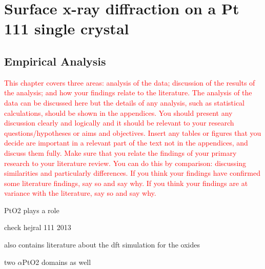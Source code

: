 \section{Surface x-ray diffraction on a Pt 111 single crystal} \label{sec:SXRD111}


\subsection{Empirical Analysis}

\textcolor{red}{This chapter covers three areas: analysis of the data; discussion of the results of the analysis; and how your findings relate to the literature. The analysis of the data can be discussed here but the details of any analysis, such as statistical calculations, should be shown in the appendices. You should present any discussion clearly and logically and it should be relevant to your research questions/hypotheses or aims and objectives. Insert any tables or figures that you decide are important in a relevant part of the text not in the appendices, and discuss them fully. Make sure that you relate the findings of your primary research to your literature review. You can do this by comparison: discussing similarities and particularly differences. If you think your findings have confirmed some literature findings, say so and say why. If you think your findings are at variance with the literature, say so and say why.}


PtO2 plays a role \cite{McCabe1986, HANNEVOLD2005}


check hejral 111 2013

also contains literature about the dft simulation for the oxides

two $\alpha$PtO2 domains as well